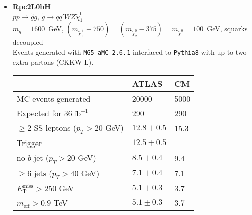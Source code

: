 \documentclass[10pt,fleqn]{article}
\newcommand{\met}{E^\mathrm{miss}_\mathrm{T}}
\newcommand{\meff}{m_\mathrm{eff}}
\begin{document}
\begin{itemize}
\item \textbf{Rpc2L0bH}\\ $ p p \to \tilde{g} \tilde{g} $, $\tilde{g} \to q \bar{q}' W Z \tilde{\chi}_1^0$\\
 $m_{g} = 1600$~GeV, $(m_{\tilde{\chi}_1^\pm} - 750) = (m_{\tilde{\chi}_2^0} - 375) = m_{\tilde{\chi}_1^0} = 100$~GeV, squarks decoupled\\
 Events generated with \texttt{MG5\_aMC 2.6.1} interfaced to \texttt{Pythia8} with up to two extra partons (CKKW-L).
 \begin{tabular}{l|p{3cm}|p{3cm}} \toprule
                                           &  ATLAS           & CM  \\ \midrule
 MC events generated                       &  20000          & 5000 \\ \midrule
 Expected for $36\ \mathrm{fb}^{-1}$       &  290            & 290  \\
 $\geq 2$ SS leptons ($p_T > 20$ GeV)      & $12.8\pm 0.5$   & 15.3  \\
 Trigger                                   & $12.5\pm 0.5$   &  --\\
 no $b$-jet ($p_T > 20$ GeV)               & $8.5 \pm 0.4$   & 9.4 \\
 $\geq 6$ jets ($p_T > 40$ GeV)            & $7.1 \pm 0.4$   & 7.1 \\
 $\met  > 250$ GeV                         & $5.1 \pm 0.3$   & 3.7 \\
 $\meff > 0.9$ TeV                         & $5.1 \pm 0.3$   & 3.7 \\   \bottomrule
 \end{tabular}   
 

\end{itemize}
\end{document}
